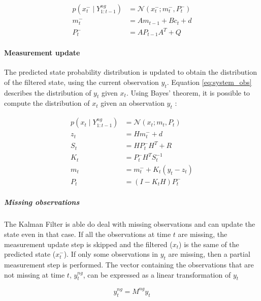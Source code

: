 \documentclass{article}
\newcommand{\norm}[3]{\mathcal{N}\left(#1; #2, #3\right)} %
\begin{document}
\begin{align}\label{eq:time_update}
    p(x^-_t \mid Y^{ng}_{1:t-1}) &= \norm{x_t^-}{m_t^-}{ P_t^-}\\
    m_t^- &= Am_{t-1} + B c_t + d \label{eq:time_update_mean}\\
    P_t^- &= AP_{t-1}A^T + Q \label{eq:time_update_cov}
\end{align} 

\paragraph{Measurement update}

The predicted state probability distribution is updated to obtain the distribution of the filtered state, using the current observation $y_t$. Equation \ref{eq:system_obs} describes the distribution of $y_t$ given $x_t$. Using Bayes' theorem, it is possible to compute the distribution of $x_t$ given an observation $y_t$ \cite{bishop_pattern_2006, 2020_hennig_pml}:

\begin{align}
 p(x_t \mid Y^{ng}_{1:t-1}) &= \mathcal{N}(x_t; m_t, P_t) \label{eq:meas_update}\\
 z_t &= Hm_t^- + d \label{eq:meas_update:obs_mean}\\
 S_t &= HP_t^-H^T + R \label{eq:meas_update:obs_cov}\\
 K_t &= P_t^-H^TS_t^{-1} \label{eq:meas_update:kalman_gain}\\
 m_t &= m_t^- + K_t(y_t - z_t) \label{eq:meas_update:state_mean}\\
 P_t &= (I-K_tH)P_t^- \label{eq:meas_update:state_cov}
\end{align}
    
\subparagraph{Missing observations}

The Kalman Filter is able do deal with missing observations and can update the state even in that case. 
If all the observations at time $t$ are missing, the measurement update step is skipped and the filtered ($x_t$) is the same of the predicted state ($x_t^-$). If only some observations in $y_t$ are missing, then a partial measurement step is performed.
The vector containing the observations that are not missing at time $t$, $y^{ng}_t$, can be expressed as a linear transformation of $y_t$

\begin{equation}\label{eq:miss_obs}
    y^{ng}_t = M^{ng}y_t
\end{equation}
\end{document}

